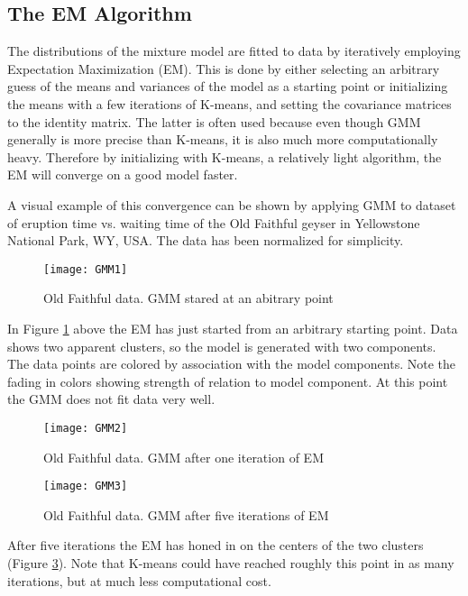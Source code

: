 \subsection{The EM Algorithm}
The distributions of the mixture model are fitted to data by iteratively employing Expectation Maximization (EM).
This is done by either selecting an arbitrary guess of the means and variances of the model as a starting point or initializing the means with a few iterations of K-means, and setting the covariance matrices to the identity matrix. 
The latter is often used because even though GMM generally is more precise than K-means, it is also much more computationally heavy.
Therefore by initializing with K-means, a relatively light algorithm, the EM will converge on a good model faster.

A visual example of this convergence can be shown by applying GMM to dataset of eruption time vs. waiting time of the Old Faithful geyser in Yellowstone National Park, WY, USA.
The data has been normalized for simplicity. 
\\

\begin{figure}[H]
\centering
\texttt{[image: GMM1]}
\caption{Old Faithful data. GMM stared at an abitrary point}
\label{fig:GMM1}
\end{figure}

In Figure \ref{fig:GMM1} above the EM has just started from an arbitrary starting point.
Data shows two apparent clusters, so the model is generated with two components.
The data points are colored by association with the model components.
Note the fading in colors showing strength of relation to model component.
At this point the GMM does not fit data very well.

\begin{figure}[H]
\centering
\texttt{[image: GMM2]}
\caption{Old Faithful data. GMM after one iteration of EM}
\label{fig:GMM2}
\end{figure}

\begin{figure}[H]
\centering
\texttt{[image: GMM3]}
\caption{Old Faithful data. GMM after five iterations of EM}
\label{fig:GMM3}
\end{figure}

After five iterations the EM has honed in on the centers of the two clusters (Figure \ref{fig:GMM3}).
Note that K-means could have reached roughly this point in as many iterations, but at much less computational cost.

